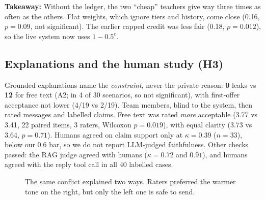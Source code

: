 \documentclass[10pt,a4paper]{article}
\newcommand{\tk}[1]{\textbf{Takeaway:} #1}
\begin{document}
\begin{takeaway}
\tk{Without the ledger, the two ``cheap'' teachers give way three times as often as the others.
Flat weights, which ignore tiers and history, come close (0.16, $p{=}0.09$, not significant).
The earlier capped credit was less fair (0.18, $p{=}0.012$), so the live system now uses $1{-}0.5^c$.}
\end{takeaway}

\subsection{Explanations and the human study (H3)}
Grounded explanations name the \emph{constraint}, never the private reason: \textbf{0}
leaks vs \textbf{12} for free text (A2; in 4 of 30 scenarios, so not significant), with first-offer acceptance not lower (4/19 vs 2/19).
Team members, blind to the system, then rated messages and labelled claims. Free text was rated
\emph{more} acceptable (3.77 vs 3.41, 22 paired items, 3 raters, Wilcoxon $p{=}0.019$), with equal
clarity (3.73 vs 3.64, $p{=}0.71$). Humans agreed on claim support only at $\kappa{=}0.39$
($n{=}33$), below our 0.6 bar, so we do not report LLM-judged faithfulness. Other checks passed:
the RAG judge agreed with humans ($\kappa{=}0.72$ and $0.91$), and humans agreed with the reply
tool call in all 40 labelled cases.

\begin{figure}[H]
\centering
{}
\caption{The same conflict explained two ways. Raters preferred the warmer tone on the right, but
only the left one is safe to send.}
\label{fig:msgs}
\end{figure}
\end{document}
